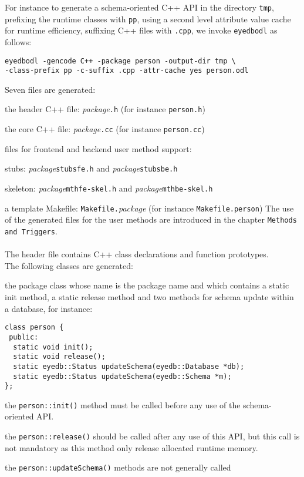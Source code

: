 For instance to generate a schema-oriented C++ API in the directory
\texttt{tmp}, prefixing the runtime classes with \texttt{pp},
using a second level attribute value cache for runtime efficiency, suffixing
C++ files with \texttt{.cpp}, we invoke \texttt{eyedbodl} as follows:
\begin{verbatim}
eyedbodl -gencode C++ -package person -output-dir tmp \
-class-prefix pp -c-suffix .cpp -attr-cache yes person.odl
\end{verbatim}
Seven files are generated:
\be
\item the header C++ file: \emph{package}\texttt{.h}
 (for instance \texttt{person.h})
\item the core C++ file: \emph{package}\texttt{.cc}
(for instance \texttt{person.cc})
\item files for frontend and backend user method support:
\be
\item stubs: \emph{package}\texttt{stubsfe.h}
and  \emph{package}\texttt{stubsbe.h}
\item skeleton: \emph{package}\texttt{mthfe-skel.h}
and  \emph{package}\texttt{mthbe-skel.h}
\item a template Makefile:
\texttt{Makefile.}\emph{package}
\ee
(for instance \texttt{Makefile.person})
\ee
The use of the generated files for the user methods are introduced in the
chapter \texttt{Methods and Triggers}.
\\
\\
The header file contains C++ class declarations and function prototypes.
\\
The following classes are generated:
\be
\item the package class whose name is the package name and which contains
a static init method, a static release method and two methods for
schema update within a database, for instance:
\verbsize
\begin{verbatim}
class person {
 public:
  static void init();
  static void release();
  static eyedb::Status updateSchema(eyedb::Database *db);
  static eyedb::Status updateSchema(eyedb::Schema *m);
};
\end{verbatim}
\normalsize
\be
\item the \texttt{person::init()} method must be called before any use of
the schema-oriented API.
\item the \texttt{person::release()} should be called after any use
of this API, but this call is not mandatory as this method only
release allocated runtime memory.
\item the \texttt{person::updateSchema()} methods are not generally called
